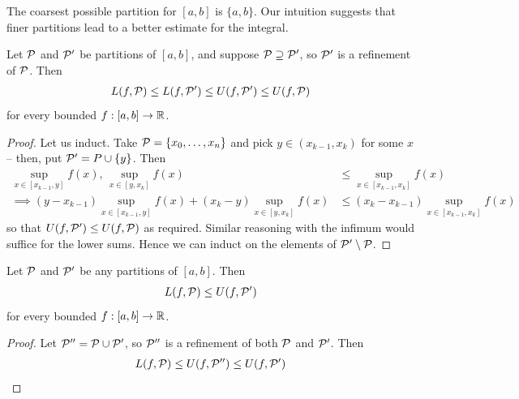 \documentclass{../../template/note}
\begin{document}
    
    The coarsest possible partition for \([a, b]\) is \(\{a, b\}\). Our intuition suggests that finer partitions lead to a better estimate for the integral.

    \begin{lemma}
        Let \(\mathcal{P}\) and \(\mathcal{P}'\) be partitions of \([a, b]\), and suppose \(\mathcal{P} \supseteq \mathcal{P}'\), so \(\mathcal{P}'\) is a refinement of \(\mathcal{P}\). Then 
        \begin{align*}
            L(f, \mathcal{P}) \leq L(f, \mathcal{P}') \leq U(f, \mathcal{P}') \leq U(f, \mathcal{P})
        \end{align*}
        for every bounded \(f: [a, b] \to \mathbb R\).
    \end{lemma}
    
    \begin{proof}
        Let us induct. Take \(\mathcal{P} = \{x_0, \dots, x_n\}\) and pick \(y \in (x_{k-1}, x_k)\) for some \(x\) -- then, put \(\mathcal{P}' = P \cup \{y\}\). Then
        \begin{align*}
            \sup_{x \in [x_{k-1},y]} f(x), \, \sup_{x \in [y,x_k]} f(x) &\leq \sup_{x \in [x_{k-1}, x_k]}f(x) \\ 
            \implies (y-x_{k-1})\sup_{x \in [x_{k-1},y]} f(x) + (x_k-y)\sup_{x \in [y,x_k]} f(x) &\leq (x_k-x_{k-1}) \sup_{x \in [x_{k-1}, x_k]}f(x)
        \end{align*}
        so that \(U(f, \mathcal{P}') \leq U(f, \mathcal{P})\) as required. Similar reasoning with the infimum would suffice for the lower sums. Hence we can induct on the elements of \(\mathcal{P}' \setminus \mathcal{P}\).
    \end{proof}
    
    \begin{lemma}
        Let \(\mathcal{P}\) and \(\mathcal{P}'\) be any partitions of \([a, b]\). Then
        \begin{align*}
            L(f, \mathcal{P}) \leq U(f, \mathcal{P}')
        \end{align*}
        for every bounded \(f: [a, b] \to \mathbb R\).
    \end{lemma}
    
    \begin{proof}
        Let \(\mathcal{P}'' = \mathcal{P} \cup \mathcal{P}'\), so \(\mathcal{P}''\) is a refinement of both \(\mathcal{P}\) and \(\mathcal{P}'\). Then
        \begin{align*}
            L(f, \mathcal{P}) \leq U(f, \mathcal{P}'') \leq U(f, \mathcal{P}')
        \end{align*}
    \end{proof}
    
\end{document}
